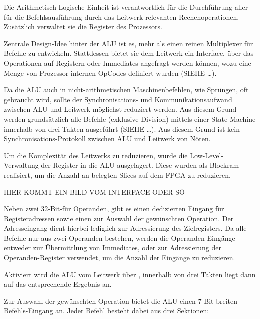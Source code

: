 
Die Arithmetisch Logische Einheit ist verantwortlich f\"ur die Durchf\"uhrung aller f\"ur die Befehlsausf\"uhrung durch das Leitwerk relevanten Rechenoperationen. Zus\"atzlich verwaltet sie die Register des Prozessors.


Zentrale Design-Idee hinter der ALU ist es, mehr als einen reinen Multiplexer f\"ur Befehle zu entwickeln. Stattdessen bietet sie dem Leitwerk ein Interface,
\"uber das Operationen auf Registern oder Immediates angefragt werden k\"onnen, wozu eine Menge von Prozessor-internen OpCodes definiert wurden (SIEHE …).

Da die ALU auch in nicht-arithmetischen Maschinenbefehlen, wie Spr\"ungen, oft gebraucht wird, sollte der Synchronisations- und Kommunikationsaufwand zwischen ALU und Leitwerk m\"oglichst reduziert werden.
Aus diesem Grund werden grunds\"atzlich alle Befehle (exklusive Division) mittels einer State-Machine innerhalb von drei Takten ausgef\"uhrt (SIEHE …). Aus diesem Grund ist kein Synchronisations-Protokoll zwischen ALU und Leitwerk von N\"oten.

Um die Komplexit\"at des Leitwerks zu reduzieren, wurde die Low-Level-Verwaltung der Register in die ALU ausgelagert. Diese wurden als Blockram realisiert, um die Anzahl an belegten Slices auf dem FPGA zu reduzieren.

HIER KOMMT EIN BILD VOM INTERFACE ODER S\"O

Neben zwei 32-Bit-f\"ur Operanden, gibt es einen dedizierten Eingang f\"ur Registeradressen sowie einen zur Auswahl der gew\"unschten Operation. 
Der Adresseingang dient hierbei lediglich zur Adressierung des Zielregisters. Da alle Befehle nur aus zwei Operanden bestehen, werden die Operanden-Eing\"ange entweder zur \"Ubermittlung von Immediates, oder zur Adressierung der Operanden-Register verwendet, um die Anzahl der Eing\"ange zu reduzieren.

Aktiviert wird die ALU vom Leitwerk \"uber , innerhalb von drei Takten liegt dann auf  das entsprechende Ergebnis an.

Zur Auswahl der gew\"unschten Operation bietet die ALU einen 7 Bit breiten Befehls-Eingang an.
Jeder Befehl besteht dabei aus drei Sektionen\vspace{10pt}:

\vspace{5pt}

